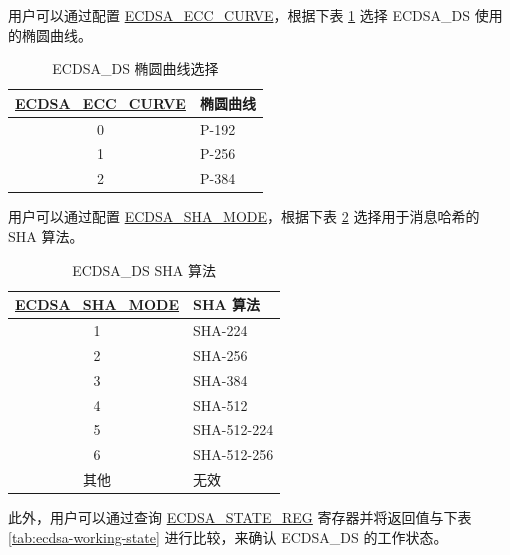 \documentclass[main\_\_CN.tex]{subfiles}
\begin{document}
用户可以通过配置 \hyperref[fielddesc:ECDSAECCCURVE]{ECDSA\_ECC\_CURVE}，根据下表 \ref{tab:ecdsa-curve-selection} 选择 ECDSA\_DS 使用的椭圆曲线。

\begin{table}[H]
    \centering
    \caption{ECDSA\_DS 椭圆曲线选择}
    \label{tab:ecdsa-curve-selection}
    \begin{tabular}{ | c | l | }
    \hline
        \rowcolor{lightgray}
        \textbf{\hyperref[fielddesc:ECDSAECCCURVE]{ECDSA\_ECC\_CURVE}}      & \textbf{椭圆曲线}\\
        \hline
        0                       & P-192    \\\hline
        1                       & P-256    \\\hline
        2                       & P-384    \\\hline
    \end{tabular}
\end{table}

用户可以通过配置 \hyperref[fielddesc:ECDSASHAMODE]{ECDSA\_SHA\_MODE}，根据下表 \ref{tab:ecdsa-sha-algorithms} 选择用于消息哈希的 SHA 算法。

\begin{table}[H]
    \centering
    \caption{ECDSA\_DS SHA 算法}
    \label{tab:ecdsa-sha-algorithms}
    \begin{tabular}{ | c | l | }
    \hline
        \rowcolor{lightgray}
        \textbf{\hyperref[fielddesc:ECDSASHAMODE]{ECDSA\_SHA\_MODE}}      & \textbf{SHA 算法}\\
        \hline
        1                       & SHA-224    \\\hline
        2                       & SHA-256    \\\hline
        3                       & SHA-384    \\\hline
        4                       & SHA-512    \\\hline
        5                       & SHA-512-224    \\\hline
        6                       & SHA-512-256    \\\hline
        其他                  & 无效    \\\hline
    \end{tabular}
\end{table}

此外，用户可以通过查询 \hyperref[regdesc:ECDSASTATEREG]{ECDSA\_STATE\_REG} 寄存器并将返回值与下表 \ref{tab:ecdsa-working-state} 进行比较，来确认 ECDSA\_DS 的工作状态。
\end{document}
